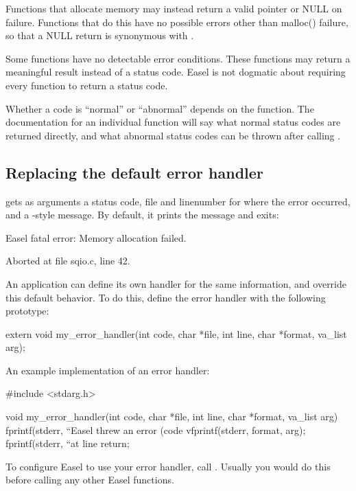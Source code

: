 \documentclass[11pt]{article}
\begin{document}
Functions that allocate memory may instead return a valid pointer or
NULL on failure. Functions that do this have no possible errors other
than malloc() failure, so that a NULL return is synonymous with
.

Some functions have no detectable error conditions. These functions
may return a meaningful result instead of a status code. Easel is not
dogmatic about requiring every function to return a status code.

Whether a code is ``normal'' or ``abnormal'' depends on the function.
The documentation for an individual function will say what normal
status codes are returned directly, and what abnormal status codes can
be thrown after calling .

\subsection{Replacing the default error handler}

 gets as arguments a status code, file and
linenumber for where the error occurred, and a -style
message. By default, it prints the message and exits:

\begin{cchunk}
Easel fatal error:
Memory allocation failed.

Aborted at file sqio.c, line 42. 
\end{cchunk}

An application can define its own handler for the same information,
and override this default behavior. To do this, define the error
handler with the following prototype:

\begin{cchunk}
extern void my_error_handler(int code, char *file, int line, char *format, va_list arg);
\end{cchunk}

An example implementation of an error handler:

\begin{cchunk}
#include <stdarg.h>

void
my_error_handler(int code, char *file, int line, char *format, va_list arg)
{
  fprintf(stderr, ``Easel threw an error (code %
  vfprintf(stderr, format, arg);
  fprintf(stderr, ``at line %
  return;
}
\end{cchunk}

To configure Easel to use your error handler, call
. Usually you would do
this before calling any other Easel functions.
\end{document}
